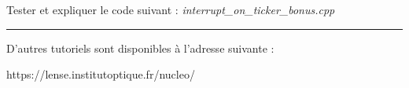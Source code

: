 \documentclass[a4paper,11pt,titlepage]{article} %
\begin{document}
\Manip Tester et expliquer le code suivant : \textsl{interrupt\_on\_ticker\_bonus.cpp}

\noindent \rule{\linewidth}{1pt}

\begin{center}
\Large
D'autres tutoriels sont disponibles à l'adresse suivante :

https://lense.institutoptique.fr/nucleo/
\end{center}


%
%
%
%
%
%
%
%
%
%
%
%
%
\end{document}
